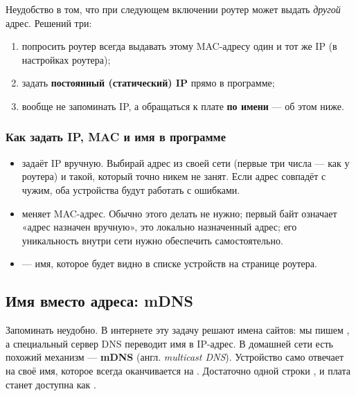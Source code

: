 Неудобство в том, что при следующем включении роутер может выдать \emph{другой} адрес. Решений три:
\begin{enumerate}
  \item попросить роутер всегда выдавать этому MAC-адресу один и тот же IP (в настройках роутера);
  \item задать \textbf{постоянный (статический) IP} прямо в программе;
  \item вообще не запоминать IP, а обращаться к плате \textbf{по имени} --- об этом ниже.
\end{enumerate}

\subsubsection{Как задать IP, MAC и имя в программе}


\begin{itemize}
  \item {} задаёт IP вручную. Выбирай адрес из своей сети
        (первые три числа --- как у роутера) и такой, который точно никем не занят. Если адрес совпадёт
        с чужим, оба устройства будут работать с ошибками.
  \item {} меняет MAC-адрес. Обычно этого делать не нужно; первый байт
         означает «адрес назначен вручную», это локально назначенный адрес; его уникальность внутри сети нужно обеспечить самостоятельно.
  \item {} --- имя, которое будет видно в списке устройств на странице роутера.
\end{itemize}

\subsection{Имя вместо адреса: mDNS}

Запоминать  неудобно. В интернете эту задачу решают имена сайтов: мы пишем
, а специальный сервер DNS переводит имя в IP-адрес. В домашней сети есть похожий
механизм --- \textbf{mDNS} (англ. \emph{multicast DNS}). Устройство само отвечает на своё имя, которое
всегда оканчивается на . Достаточно одной строки , и
плата станет доступна как .

